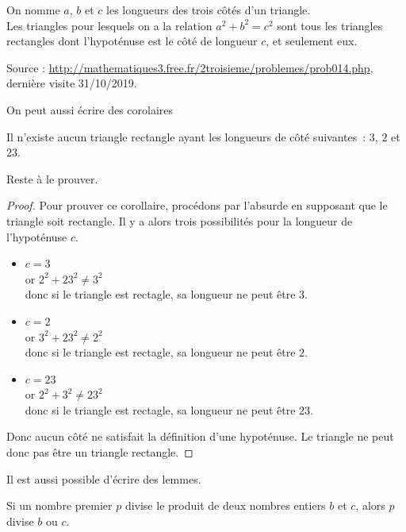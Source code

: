 \documentclass[francais,RandD]{rapportPFE}
\begin{document}
\begin{Theorem}
\label{Th:Pythagore}
On nomme $a$, $b$ et $c$ les longueurs des trois côtés d'un triangle.\\
Les triangles pour lesquels on a la relation $a^{2}+ b^{2} = c^{2}$ sont tous les triangles rectangles dont l'hypoténuse est le côté de longueur $c$, et seulement eux.

Source : \url{http://mathematiques3.free.fr/2troisieme/problemes/prob014.php}, dernière visite 31/10/2019.
\end{Theorem}

On peut aussi écrire des corolaires
\begin{Corollary}[]
\label{Cor:TriangleImpossible}
Il n'existe aucun triangle rectangle ayant les longueurs de côté suivantes~: $3$, $2$ et $23$.
\end{Corollary}

Reste à le prouver.
\begin{proof}
Pour prouver ce corollaire, procédons par l'absurde en supposant que le triangle soit rectangle. Il y a alors trois possibilités pour la longueur de l'hypoténuse $c$.
\begin{itemize}
\item $c=3$\\
or $2^{2}+ 23^{2} \neq 3^{2}$\\
donc si le triangle est rectagle, sa longueur ne peut être $3$.
\item $c=2$\\
or $3^{2}+ 23^{2} \neq 2^{2}$\\
donc si le triangle est rectagle, sa longueur ne peut être $2$.
\item $c=23$\\
or $2^{2}+ 3^{2} \neq 23^{2}$\\
donc si le triangle est rectagle, sa longueur ne peut être $23$.
\end{itemize}
Donc aucun côté ne satisfait la définition d'une hypoténuse. Le triangle ne peut donc pas être un triangle rectangle.
\end{proof}
Il est aussi possible d'écrire des lemmes.

\begin{Lemma}
\label{lem:Euclide}
Si un nombre premier $p$ divise le produit de deux nombres entiers $b$ et $c$, alors $p$ divise $b$ ou $c$.
\end{Lemma}
\end{document}
